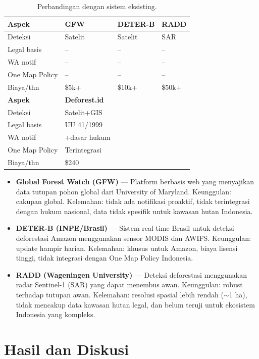 \documentclass[10pt,conference,a4paper]{IEEEtran}
\begin{document}
\begin{table}[H]
\centering
\caption{Perbandingan dengan sistem eksisting.}
\label{tab:comparison}
\small
\begin{tabular}{p{2.8cm}p{1.8cm}p{1.8cm}p{1.8cm}}
\toprule
\textbf{Aspek} & \textbf{GFW} & \textbf{DETER-B} & \textbf{RADD} \\
\midrule
Deteksi & Satelit & Satelit & SAR \\
Legal basis & -- & -- & -- \\
WA notif & -- & -- & -- \\
One Map Policy & -- & -- & -- \\
Biaya/thn & \$5k+ & \$10k+ & \$50k+ \\
\midrule
\textbf{Aspek} & \textbf{Deforest.id} \\
\midrule
Deteksi & Satelit+GIS \\
Legal basis & UU 41/1999 \\
WA notif & +dasar hukum \\
One Map Policy & Terintegrasi \\
Biaya/thn & \$240 \\
\bottomrule
\end{tabular}
\end{table}

\begin{itemize}
    \item \textbf{Global Forest Watch (GFW)} --- Platform berbasis web
    yang menyajikan data tutupan pohon global dari University of
    Maryland. Keunggulan: cakupan global. Kelemahan: tidak ada
    notifikasi proaktif, tidak terintegrasi dengan hukum nasional,
    data tidak spesifik untuk kawasan hutan Indonesia.
    \item \textbf{DETER-B (INPE/Brasil)} --- Sistem real-time
    Brasil untuk deteksi deforestasi Amazon menggunakan sensor
    MODIS dan AWIFS. Keunggulan: update hampir harian. Kelemahan:
    khusus untuk Amazon, biaya lisensi tinggi, tidak integrasi
    dengan One Map Policy Indonesia.
    \item \textbf{RADD (Wageningen University)} --- Deteksi
    deforestasi menggunakan radar Sentinel-1 (SAR) yang dapat
    menembus awan. Keunggulan: robust terhadap tutupan awan.
    Kelemahan: resolusi spasial lebih rendah ($\sim$1 ha), tidak
    mencakup data kawasan hutan legal, dan belum teruji untuk
    ekosistem Indonesia yang kompleks.
\end{itemize}

\section{Hasil dan Diskusi}
\end{document}

